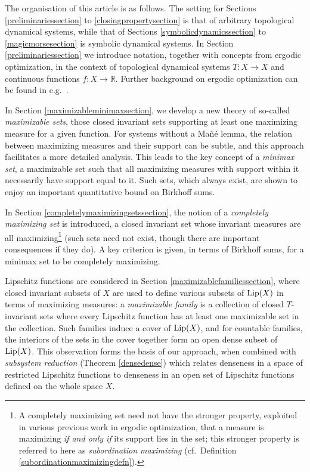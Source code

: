 \documentclass[reqno,11pt]{amsart}
\theoremstyle{definition}
\theoremstyle{remark}
\theoremstyle{remark}
\def \R {\mathbb R}
\def\lip{{\rm Lip}}
\numberwithin{equation}{section}
\begin{document}
The organisation of this article is as follows.
The setting for Sections \ref{preliminariessection} to \ref{closingpropertysection} is that of
arbitrary topological dynamical systems,
while that of Sections \ref{symbolicdynamicssection} to \ref{magicmorsesection} is 
symbolic dynamical systems.
In Section \ref{preliminariessection} we introduce notation,
together with concepts from ergodic optimization,
in the context of topological dynamical systems $T:X\to X$ and continuous functions $f:X\to\R$.
Further background on ergodic optimization can be found in e.g.~\cite{Boc18, Jen19}.

In Section \ref{maximizableminimaxsection}, 
we 
develop a new theory of so-called \emph{maximizable sets},
those closed invariant sets supporting at least one maximizing measure for a given function.
For systems without a Ma\~n\'e lemma, the relation between maximizing measures and their support can be subtle, 
and this approach facilitates a more 
detailed analysis.
This leads to the key concept of a \emph{minimax set}, a maximizable set such that all maximizing measures with support within it necessarily have support equal to it. 
Such sets, which always exist, are shown to enjoy an important quantitative bound on Birkhoff sums.


In Section \ref{completelymaximizingsetssection}, the notion of a \emph{completely maximizing set} is introduced, a closed invariant set whose invariant measures are all maximizing\footnote{A completely maximizing set need not have the stronger property, exploited in various previous work 
in ergodic optimization,
 that a measure is maximizing \emph{if and only if} its support lies in the set; this stronger property is referred to here as \emph{subordination maximizing} (cf.~Definition \ref{subordinationmaximizingdefn}).}
(such sets need not exist, though there are important consequences if they do).
A key criterion is given, in terms of Birkhoff sums, for a minimax set to be completely maximizing.

Lipschitz functions are considered in Section \ref{maximizablefamiliessection}, where
closed invariant subsets of $X$ are used to define various subsets of $\lip(X)$ in terms of maximizing measures:
a \emph{maximizable family} is 
a collection of closed $T$-invariant sets 
where
every Lipschitz function has
at least one maximizable set in the collection.
Such families induce a 
cover of $\lip(X)$, and
for countable families, the interiors of the sets in the cover
together form an open dense subset of $\lip(X)$. This observation forms the basis of our approach,
when combined with 
\emph{subsystem reduction} (Theorem \ref{densedense}) which relates denseness in a space of restricted Lipschitz functions to denseness in an open set of Lipschitz functions defined on the whole space $X$.
\end{document}
